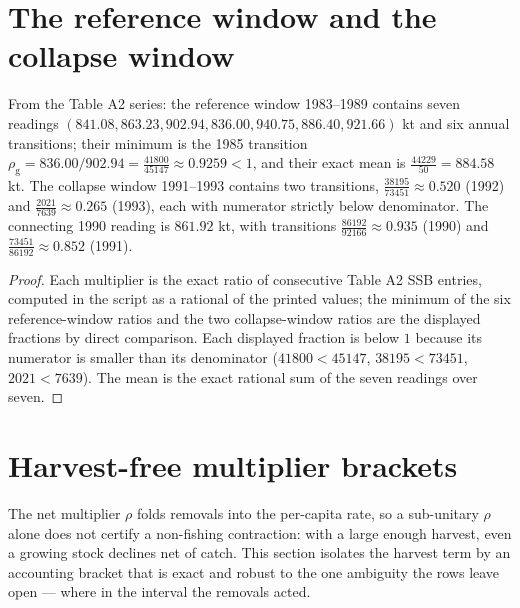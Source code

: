 \section{The reference window and the collapse window}\label{regime-windows}

\begin{proposition}
\label{regime-prop:windows}
From the Table A2 series: the reference window 1983--1989 contains
seven readings \((841.08, 863.23, 902.94, 836.00, 940.75, 886.40,
921.66)\) kt and six annual transitions; their minimum is the 1985
transition \(\rho_{\mathrm{g}} = 836.00/902.94 =
\tfrac{41800}{45147} \approx 0.9259 < 1\), and their exact mean is
\(\tfrac{44229}{50} = 884.58\) kt. The collapse window 1991--1993
contains two transitions,
\(\tfrac{38195}{73451} \approx 0.520\) (1992) and
\(\tfrac{2021}{7639} \approx 0.265\) (1993), each with numerator
strictly below denominator. The connecting 1990 reading is
\(861.92\) kt, with transitions
\(\tfrac{86192}{92166} \approx 0.935\) (1990) and
\(\tfrac{73451}{86192} \approx 0.852\) (1991).
\end{proposition}

\begin{proof}
Each multiplier is the exact ratio of consecutive Table A2 SSB entries,
computed in the script as a rational of the printed values; the
minimum of the six reference-window ratios and the two collapse-window
ratios are the displayed fractions by direct comparison. Each
displayed fraction is below \(1\) because its numerator is smaller
than its denominator (\(41800 < 45147\), \(38195 < 73451\),
\(2021 < 7639\)). The mean is the exact rational sum of the seven
readings over seven.
\end{proof}

\section{Harvest-free multiplier brackets}\label{regime-brackets}

The net multiplier \(\rho\) folds removals into the per-capita rate,
so a sub-unitary \(\rho\) alone does not certify a non-fishing
contraction: with a large enough harvest, even a growing stock
declines net of catch. This section isolates the harvest term by an
accounting bracket that is exact and robust to the one ambiguity the
rows leave open --- where in the interval the removals acted.

